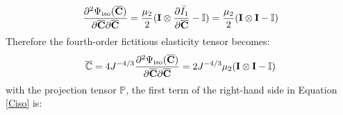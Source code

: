 \begin{equation}
\frac{\partial^2\Psi_\mathrm{iso}(\overline{\bold{C}})}{\partial\overline{\bold{C}}\partial\overline{\bold{C}}} = 
\frac{\mu_2}{2}(\bold{I} \otimes \frac{\partial{\bar{I_1}}}{\partial{\overline{\bold{C}}}} - \mathbb{I}) = \frac{\mu_2}{2}(\bold{I} \otimes \bold{I} - \mathbb{I})
\end{equation}
Therefore the fourth-order fictitious elasticity tensor becomes:
\begin{equation}
\overline{\mathbb{C}} = 4J^{-4/3}\frac{\partial^2\Psi_\mathrm{iso}(\overline{\bold{C}})}{\partial{\overline{\bold{C}}}{\partial{\overline{\bold{C}}}}} = 2J^{-4/3}\mu_2(\bold{I} \otimes \bold{I} - \mathbb{I})
\end{equation}
with the projection tensor $\mathbb{P}$, the first term of the right-hand side in Equation \ref{Ciso} is:

